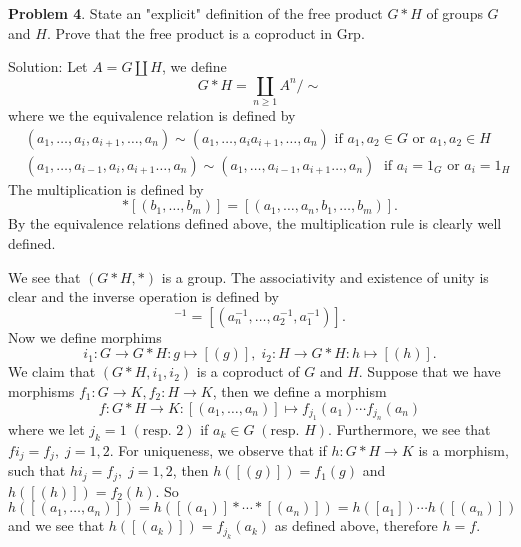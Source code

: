 \begin{dang}
    \textbf{Problem 4}. State an "explicit" definition of the free product \(G*H\) of groups \(G\) and \(H\). 
Prove that the free product is a coproduct in Grp.
\end{dang}
Solution: Let $A = G \textstyle\coprod H$, we define
\begin{equation}
    G*H = \coprod_{n\geq1}A^n\bigg/\sim 
\end{equation}
where we the equivalence relation is defined by 
\begin{equation}
    \begin{aligned}
        &(a_1,\dots, a_i,a_{i+1},\dots,a_n)\sim (a_1,\dots, a_ia_{i+1},\dots,a_n)
        \text{ if }a_1,a_2\in G\text{ or } a_1,a_2\in H\\
        &(a_1,\dots, a_{i-1},a_i,a_{i+1} \dots, a_n)\sim (a_1,\dots, a_{i-1},a_{i+1} \dots, a_n)\;\text{ if } 
        a_i = 1_G \text{ or } a_i = 1_H
    \end{aligned}
\end{equation}
The multiplication is defined by 
\begin{equation}
    [(a_1,\dots,a_n)]* [(b_1,\dots, b_m)] = [(a_1,\dots,a_n,b_1,\dots, b_m)].
\end{equation}
By the equivalence relations defined above, the multiplication rule is clearly well defined.\par  
We see that $(G*H, *)$ is a group. The associativity and existence of unity is clear and 
the inverse operation is defined by 
\begin{equation}
    [(a_1,a_2,\dots,a_n)]^{-1}=[(a_n^{-1},\dots, a_2^{-1},a_1^{-1})].
\end{equation}
Now we define morphims
\begin{equation}
    i_1: G \to G*H: g\mapsto [(g)],\; i_2:H\to G*H: h\mapsto [(h)].
\end{equation}
We claim that $(G*H, i_1,i_2)$ is a coproduct of $G$ and $H$. Suppose that we have morphisms 
$f_1: G\to K, f_2:H\to K$, then we define a morphism 
\begin{equation}
  f:  G*H \to K: [(a_1,\dots, a_n)]\mapsto  f_{j_1}(a_1)\cdots f_{j_n}(a_n)
\end{equation}
where we let $j_k=1\;(\text{resp. }2)$ if $a_k\in G\;(\text{resp. }H)$. Furthermore, we see that 
$f i_j=f_j,\;j=1,2$. For uniqueness, we observe that if $h:G*H\to K$ is a morphism, such that 
$h i_j = f_j,\;j=1,2$, then $h([(g)])=f_1(g)$ and $h([(h)])=f_2(h)$. So 
\begin{equation}
    h([(a_1,\dots, a_n)])=h([(a_1)]*\cdots*[(a_n)])=h([a_1])\cdots h([(a_n)])
\end{equation}
and we see that $h([(a_k)])=f_{j_k}(a_k)$ as defined above, therefore $h=f$.



